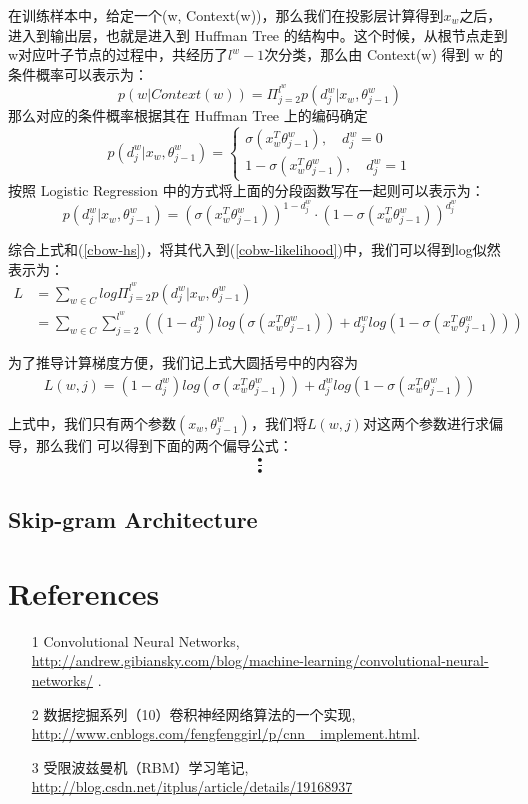 \documentclass[UTF8]{ctexart}
\begin{document}
\par
在训练样本中，给定一个(w, Context(w))，那么我们在投影层计算得到$x_w$之后，进入到输出层，也就是进入到
Huffman Tree 的结构中。这个时候，从根节点走到w对应叶子节点的过程中，共经历了$l^w-1$次分类，那么由
Context(w) 得到 w 的条件概率可以表示为：
\begin{equation}
\label{cbow-hs}
p(w|Context(w)) = \Pi_{j=2}^{l^w} p(d_j^w|x_w, \theta_{j-1}^w)
\end{equation}
那么对应的条件概率根据其在 Huffman Tree 上的编码确定
\begin{equation}
p(d_j^w|x_w, \theta_{j-1}^w)= \begin{cases}
\sigma(x_w^T \theta_{j-1}^w), \quad d_j^w=0
\\
1 - \sigma(x_w^T \theta_{j-1}^w), \quad d_j^w=1
\end{cases}
\end{equation}
按照 Logistic Regression 中的方式将上面的分段函数写在一起则可以表示为：
\[ p(d_j^w|x_w, \theta_{j-1}^w) = (\sigma(x_w^T \theta_{j-1}^w))^{1-d_j^w} %
\cdot (1-\sigma(x_w^T\theta_{j-1}^w))^{d_j^w} \]
\par
综合上式和(\ref{cbow-hs})，将其代入到(\ref{cobw-likelihood})中，我们可以得到log似然表示为：
\begin{align}
L &= \sum_{w \in C} log \Pi_{j=2}^{l^w}p(d_j^w|x_w, \theta_{j-1}^w)
\\
&= \sum_{w \in C} \sum_{j=2}^{l^w} \left( (1-d_j^w)log(\sigma(x_w^T \theta_{j-1}^w)) %
+ d_j^w log(1-\sigma(x_w^T\theta_{j-1}^w)) \right)
\end{align}
\par
为了推导计算梯度方便，我们记上式大圆括号中的内容为
\begin{align}
L(w, j) = (1-d_j^w)log(\sigma(x_w^T \theta_{j-1}^w)) + d_j^w log(1-\sigma(x_w^T\theta_{j-1}^w))
\end{align}
\par
上式中，我们只有两个参数$(x_w, \theta_{j-1}^w)$，我们将$L(w, j)$对这两个参数进行求偏导，那么我们
可以得到下面的两个偏导公式：
\begin{align}
\frac{•}{•}
\end{align}


\subsection{Skip-gram Architecture}


\section{References}
\begin{itemize}
\item[1] Convolutional Neural Networks, \\
\url{http://andrew.gibiansky.com/blog/machine-learning/convolutional-neural-networks/} .
\item[2] 数据挖掘系列（10）卷积神经网络算法的一个实现, \\
\url{http://www.cnblogs.com/fengfenggirl/p/cnn\_ implement.html}.
\item[3] 受限波兹曼机（RBM）学习笔记, \\
\url{http://blog.csdn.net/itplus/article/details/19168937}
\end{itemize}
\end{document}
